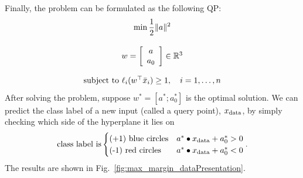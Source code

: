 Finally, the problem can be formulated as the following QP:
   $$ \underset{ \begin{array}{c} \\  w = \left[\begin{array}{c} a \\ a_0 \end{array} \right] \in \mathbb R^3  \\
   \\
        \text{subject to  }   \ell_i(w^\top \bar{x}_i) \geq 1, \quad i = 1,\dots, n \end{array}  } { \min \frac{1}{2} \lVert a \rVert^2 } 
        $$         
After solving the problem, suppose ${w}^\ast = [a^\ast; a_0^\ast]$ is the optimal solution. We can predict the class label of a new input (called a query point), $x_{\rm data}$, by simply checking which side of the hyperplane it lies on
$$\text{class label is} \begin{cases} \text{(+1) blue circles} & a^\ast \bullet x_{\rm data} + a_0^\ast > 0 \\ \text{(-1) red circles} & a^\ast \bullet x_{\rm data} + a_0^\ast < 0 \end{cases}. $$
The results are shown in Fig.~\ref{fig:max_margin_dataPresentation}. \\

\Qed

\vspace*{.2cm}

